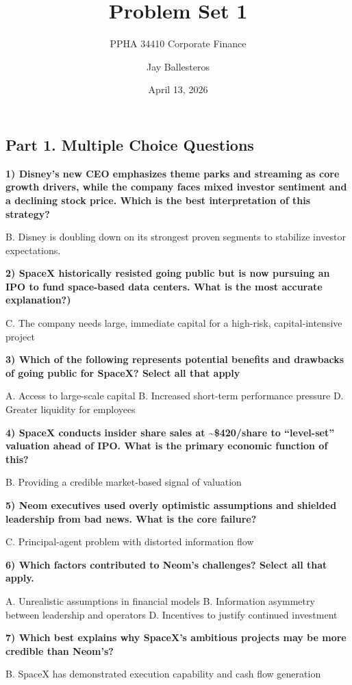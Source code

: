 \documentclass[
  12pt,
]{article}
\title{Problem Set 1}
\subtitle{PPHA 34410 Corporate Finance}
\author{Jay Ballesteros}
\date{April 13, 2026}
\begin{document}
\maketitle


\subsection{Part 1. Multiple Choice
Questions}\label{part-1.-multiple-choice-questions}

\textbf{1) Disney's new CEO emphasizes theme parks and streaming as core
growth drivers, while the company faces mixed investor sentiment and a
declining stock price. Which is the best interpretation of this
strategy?}

B. Disney is doubling down on its strongest proven segments to stabilize
investor expectations.

\textbf{2) SpaceX historically resisted going public but is now pursuing
an IPO to fund space-based data centers. What is the most accurate
explanation?)}

C. The company needs large, immediate capital for a high-risk,
capital-intensive project

\textbf{3) Which of the following represents potential benefits and
drawbacks of going public for SpaceX? Select all that apply}

A. Access to large-scale capital B. Increased short-term performance
pressure D. Greater liquidity for employees

\textbf{4) SpaceX conducts insider share sales at
\textasciitilde\$420/share to ``level-set'' valuation ahead of IPO. What
is the primary economic function of this?}

B. Providing a credible market-based signal of valuation

\textbf{5) Neom executives used overly optimistic assumptions and
shielded leadership from bad news. What is the core failure?}

C. Principal-agent problem with distorted information flow

\textbf{6) Which factors contributed to Neom's challenges? Select all
that apply.}

A. Unrealistic assumptions in financial models B. Information asymmetry
between leadership and operators D. Incentives to justify continued
investment

\textbf{7) Which best explains why SpaceX's ambitious projects may be
more credible than Neom's?}

B. SpaceX has demonstrated execution capability and cash flow generation
\end{document}
